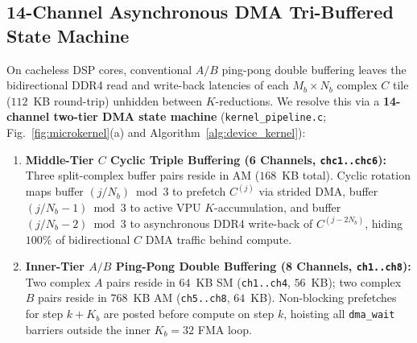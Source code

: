 \documentclass[conference]{IEEEtran}
\begin{document}
\subsection{14-Channel Asynchronous DMA Tri-Buffered State Machine}
On cacheless DSP cores, conventional $A/B$ ping-pong double buffering leaves the bidirectional DDR4 read and write-back latencies of each $M_b \times N_b$ complex $C$ tile ($112$~KB round-trip) unhidden between $K$-reductions. We resolve this via a \textbf{14-channel two-tier DMA state machine} (\texttt{kernel\_pipeline.c}; Fig.~\ref{fig:microkernel}(a) and Algorithm~\ref{alg:device_kernel}):
\begin{enumerate}\setlength{\itemsep}{0.5pt}\setlength{\parskip}{0pt}
    \item \textbf{Middle-Tier $C$ Cyclic Triple Buffering (6 Channels, \texttt{chc1..chc6}):} Three split-complex buffer pairs reside in AM ($168$~KB total). Cyclic rotation maps buffer $(j/N_b) \bmod 3$ to prefetch $C^{(j)}$ via strided DMA, buffer $(j/N_b - 1) \bmod 3$ to active VPU $K$-accumulation, and buffer $(j/N_b - 2) \bmod 3$ to asynchronous DDR4 write-back of $C^{(j-2N_b)}$, hiding $100\%$ of bidirectional $C$ DMA traffic behind compute.
    \item \textbf{Inner-Tier $A/B$ Ping-Pong Double Buffering (8 Channels, \texttt{ch1..ch8}):} Two complex $A$ pairs reside in $64$~KB SM (\texttt{ch1..ch4}, $56$~KB); two complex $B$ pairs reside in $768$~KB AM (\texttt{ch5..ch8}, $64$~KB). Non-blocking prefetches for step $k+K_b$ are posted before compute on step $k$, hoisting all \texttt{dma\_wait} barriers outside the inner $K_b=32$ FMA loop.
\end{enumerate}
\end{document}

